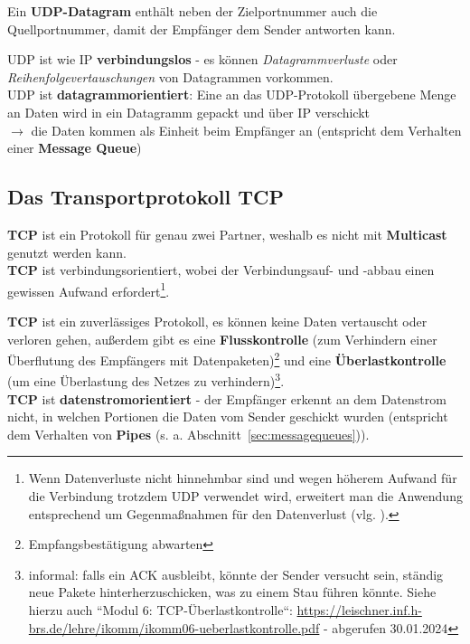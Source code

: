 \noindent
Ein \textbf{UDP-Datagram} enthält neben der Zielportnummer auch die Quellportnummer, damit der Empfänger dem Sender antworten kann.

\noindent
UDP ist wie IP \textbf{verbindungslos} - es können \textit{Datagrammverluste} oder \textit{Reihenfolgevertauschungen} von Datagrammen vorkommen.\\

\noindent
UDP ist \textbf{datagrammorientiert}: Eine an das UDP-Protokoll übergebene Menge an Daten wird in ein Datagramm gepackt und über IP verschickt\\
$\rightarrow$ die Daten kommen als Einheit beim Empfänger an (entspricht dem Verhalten einer \textbf{Message Queue})


\subsection{Das Transportprotokoll TCP}

\textbf{TCP} ist ein Protokoll für genau zwei Partner, weshalb es nicht mit \textbf{Multicast} genutzt werden kann.\\

\noindent
\textbf{TCP} ist verbindungsorientiert, wobei der Verbindungsauf- und -abbau einen gewissen Aufwand erfordert\footnote{
    Wenn Datenverluste nicht hinnehmbar sind und wegen höherem Aufwand für die Verbindung trotzdem UDP verwendet wird, erweitert man die Anwendung entsprechend um Gegenmaßnahmen für den Datenverlust (vlg. \cite[261]{Oec22}).
}.

\noindent
\textbf{TCP} ist ein zuverlässiges Protokoll, es können keine Daten vertauscht oder verloren gehen, außerdem gibt es eine \textbf{Flusskontrolle} (zum Verhindern einer Überflutung des Empfängers mit Datenpaketen)\footnote{Empfangsbestätigung abwarten} und eine \textbf{Überlastkontrolle} (um eine Überlastung des Netzes zu verhindern)\footnote{informal: falls ein ACK ausbleibt, könnte der Sender versucht sein, ständig neue Pakete hinterherzuschicken, was zu einem Stau führen könnte. Siehe hierzu auch ``Modul 6: TCP-Überlastkontrolle``: \url{https://leischner.inf.h-brs.de/lehre/ikomm/ikomm06-ueberlastkontrolle.pdf} - abgerufen 30.01.2024}.\\

\noindent
\textbf{TCP} ist \textbf{datenstromorientiert} - der Empfänger erkennt an dem Datenstrom nicht, in welchen Portionen die Daten vom Sender geschickt wurden (entspricht dem Verhalten von \textbf{Pipes} (s. a. Abschnitt~\ref{sec:messagequeues})).


